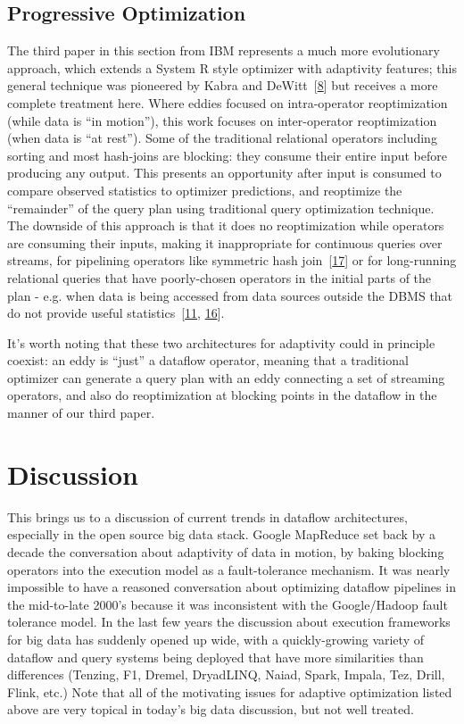 \documentclass[b5paper,11pt,twoside,openright]{book}
\newcommand\Section[2]{
  \hypertarget{#1}{
    \section{#2}\label{#1}
  }
}
\begin{document}
\hypertarget{progressive-optimization}{%
  \subsection{Progressive Optimization}\label{progressive-optimization}}

The third paper in this section from IBM represents a much more
evolutionary approach, which extends a System R style optimizer with
adaptivity features; this general technique was pioneered by Kabra and
DeWitt~{{[}\protect\hyperlink{ref-kabra1998efficient}{8}{]}} but
receives a more complete treatment here. Where eddies focused on
intra-operator reoptimization (while data is ``in motion''), this work
focuses on inter-operator reoptimization (when data is ``at rest'').
Some of the traditional relational operators including sorting and most
hash-joins are blocking: they consume their entire input before
producing any output. This presents an opportunity after input is
consumed to compare observed statistics to optimizer predictions, and
reoptimize the ``remainder'' of the query plan using traditional query
optimization technique. The downside of this approach is that it does no
reoptimization while operators are consuming their inputs, making it
inappropriate for continuous queries over streams, for pipelining
operators like symmetric hash
join~{{[}\protect\hyperlink{ref-wilschut1991dataflow}{17}{]}} or for
long-running relational queries that have poorly-chosen operators in the
initial parts of the plan - e.g. when data is being accessed from data
sources outside the DBMS that do not provide useful
statistics~{{[}\protect\hyperlink{ref-melton2002sql}{11},
  \protect\hyperlink{ref-urhan1998cost}{16}{]}}.

It's worth noting that these two architectures for adaptivity could in
principle coexist: an eddy is ``just'' a dataflow operator, meaning that
a traditional optimizer can generate a query plan with an eddy
connecting a set of streaming operators, and also do reoptimization at
blocking points in the dataflow in the manner of our third paper.

\Section{discussion}{
Discussion
}

This brings us to a discussion of current trends in dataflow
architectures, especially in the open source big data stack. Google
MapReduce set back by a decade the conversation about adaptivity of data
in motion, by baking blocking operators into the execution model as a
fault-tolerance mechanism. It was nearly impossible to have a reasoned
conversation about optimizing dataflow pipelines in the mid-to-late
2000's because it was inconsistent with the Google/Hadoop fault
tolerance model. In the last few years the discussion about execution
frameworks for big data has suddenly opened up wide, with a
quickly-growing variety of dataflow and query systems being deployed
that have more similarities than differences (Tenzing, F1, Dremel,
DryadLINQ, Naiad, Spark, Impala, Tez, Drill, Flink, etc.) Note that all
of the motivating issues for adaptive optimization listed above are very
topical in today's big data discussion, but not well treated.
\end{document}

